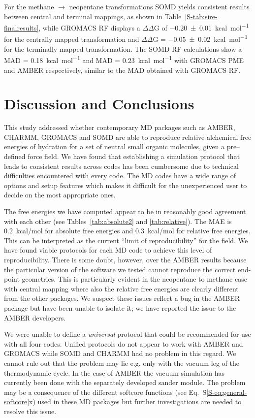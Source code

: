 \documentclass[journal=jctcce,manuscript=article]{achemso}
\begin{document}
For the methane $\rightarrow$ neopentane transformations SOMD yields consistent results between central and terminal mappings, as shown in
Table~\ref{S-tab:sire-finalresults}, while GROMACS RF displays a $\Delta\Delta$G
of \SI{-0.20 +-   0.01}{kcal.mol^{-1}} for the centrally mapped transformation
and $\Delta\Delta$G = \SI{-0.05 +- 0.02}{kcal.mol^{-1}} for the terminally
mapped transformation. The SOMD RF calculations show a MAD =
\SI{0.18}{kcal.mol^{-1}} and MAD = \SI{0.23}{kcal.mol^{-1}} with GROMACS PME
and AMBER respectively, similar to the MAD obtained with GROMACS RF.



\section{Discussion and Conclusions}
\label{sec:discuss}

This study addressed whether contemporary MD packages such as AMBER, CHARMM, GROMACS and SOMD are able to reproduce relative alchemical free energies of hydration for a set of neutral small organic molecules, given a
pre--defined force field.
We have found that establishing a simulation protocol that leads to consistent results across codes has been cumbersome due to technical difficulties encountered with every code.  The MD codes have a wide range of options and setup features which makes it difficult for the unexperienced user to decide on the most
appropriate ones.

The free energies we have computed appear to be in reasonably good agreement with each other (see Tables~\ref{tab:absolute2} and \ref{tab:relative}).  The MAE is \SI{0.2}{kcal/mol} for absolute free energies and \SI{0.3}{kcal/mol} for
relative free energies.  This can be interpreted as the current ``limit of reproducibility'' for the field.  We have found viable protocols for each MD code to achieve
this level of reproducibility.  There is some doubt, however, over the AMBER
results because the particular version of the software we tested  cannot reproduce the correct end-point
geometries.  This is particularly evident in the neopentane to methane case
with central mapping where also the relative free energies are clearly
different from the other packages.  We suspect these issues reflect a bug in
the AMBER package but have been unable to isolate it; we have reported the
issue to the AMBER developers.

We were unable to define  a \emph{universal} protocol that could be recommended for use with all four codes.  Unified protocols do not appear to work with AMBER and GROMACS while SOMD and CHARMM had no problem in this regard.  We cannot rule out that the problem may lie e.g. only with the
vacuum leg of the thermodynamic cycle.  In the case of AMBER the vacuum simulation has currently been done with the separately developed sander module.  The problem may be a consequence of the different softcore functions (see Eq.~S\ref{S-eq:general-softcore}x) used in these MD packages but further investigations are needed to resolve this issue.
\end{document}

